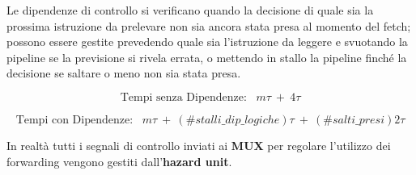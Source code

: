 \documentclass{article}
\begin{document}
Le dipendenze di controllo si verificano quando la decisione di quale sia la prossima istruzione da prelevare non sia ancora
stata presa al momento del fetch; possono essere gestite prevedendo quale sia l’istruzione da leggere e svuotando la pipeline se la previsione si rivela errata,
o mettendo in stallo la pipeline finché la decisione se saltare o meno non sia stata presa.

\[ \boxed{\text{Tempi senza Dipendenze:} \;\;\; m\tau \: + \: 4\tau} \]


\[ \boxed{\text{Tempi con Dipendenze:} \;\;\; m\tau \: + \: (\#stalli\_dip\_logiche)\tau \: + \: (\#salti\_presi)2\tau} \]


In realtà tutti i segnali di controllo inviati ai \textbf{MUX} per regolare l'utilizzo dei forwarding vengono gestiti dall'\textbf{hazard unit}. 

\newpage
\end{document}
